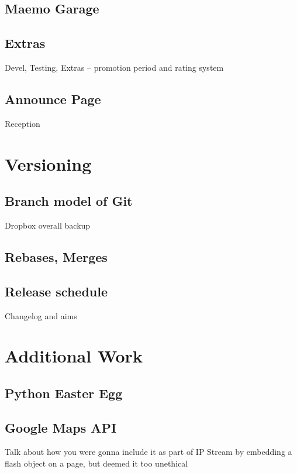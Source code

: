 \documentclass[11pt]{article} %
\begin{document}
\subsection{Maemo Garage}
\subsection{Extras}{Devel, Testing, Extras -- promotion period and rating system}
\subsection{Announce Page}{Reception}

\section{Versioning}
\subsection{Branch model of Git}{Dropbox overall backup}
\subsection{Rebases, Merges}
\subsection{Release schedule}{Changelog and aims}

\section{Additional Work}
\subsection{Python Easter Egg}
\subsection{Google Maps API}{Talk about how you were gonna include it as part of IP Stream by embedding a flash object on a page, but deemed it too unethical}
\end{document}
